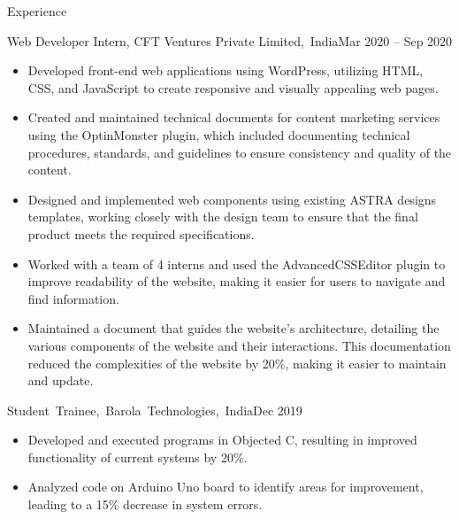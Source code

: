 \documentclass[]{mcdowellcv}
\begin{document}
	\begin{cvsection}{Experience}
		\begin{cvsubsection}{Web Developer Intern, CFT Ventures Private Limited,~India}{}{Mar 2020 – Sep 2020}
			\begin{itemize}
            \item Developed front-end web applications using WordPress, utilizing HTML, CSS, and JavaScript to create responsive and visually appealing web pages.
            \item Created and maintained technical documents for content marketing services using the OptinMonster plugin, which included documenting technical procedures, standards, and guidelines to ensure consistency and quality of the content.
		\item Designed and implemented web components using existing ASTRA      designs templates, working closely with the design team to ensure       that the final product meets the required specifications.
            \item Worked with a team of 4 interns and used the AdvancedCSSEditor plugin to improve readability of the website, making it easier for users to navigate and find information.
            \item Maintained a document that guides the website's architecture, detailing the various components of the website and their interactions. This documentation reduced the complexities of the website by 20\%, making it easier to maintain and update.
			\end{itemize}
		\end{cvsubsection}
		
            \begin{cvsubsection}{Student~Trainee,~Barola~Technologies,~India}{}{Dec 2019}
			\begin{itemize}
            	\item Developed and executed programs in Objected C, resulting in improved functionality of current systems by 20\%.
				\item Analyzed code on Arduino Uno board to identify areas for improvement, leading to a 15\% decrease in system errors.
			\end{itemize}
		\end{cvsubsection}

	\end{cvsection}
\end{document}
